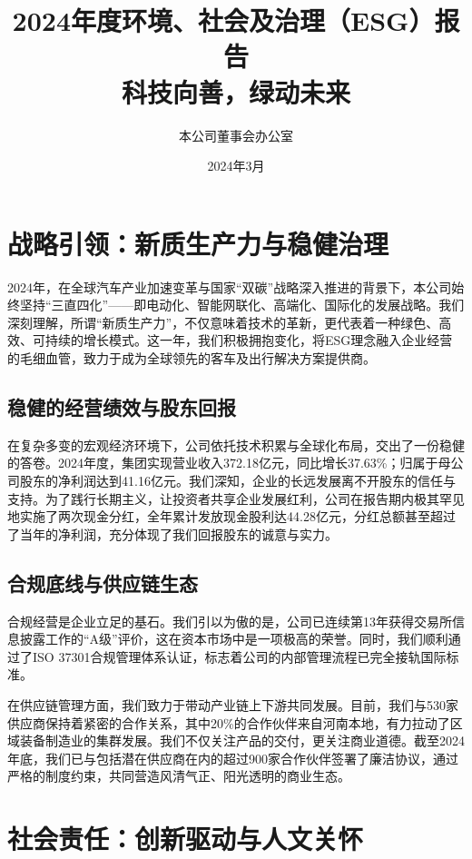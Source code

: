 \documentclass[a4paper,12pt]{article}
\title{\textbf{\huge 2024年度环境、社会及治理（ESG）报告}\\ \vspace{0.5em} \large 科技向善，绿动未来}
\author{本公司董事会办公室}
\date{2024年3月}
\begin{document}
\maketitle

\section{战略引领：新质生产力与稳健治理}

2024年，在全球汽车产业加速变革与国家“双碳”战略深入推进的背景下，本公司始终坚持“三直四化”——即电动化、智能网联化、高端化、国际化的发展战略。我们深刻理解，所谓“新质生产力”，不仅意味着技术的革新，更代表着一种绿色、高效、可持续的增长模式。这一年，我们积极拥抱变化，将ESG理念融入企业经营的毛细血管，致力于成为全球领先的客车及出行解决方案提供商。

\subsection{稳健的经营绩效与股东回报}

在复杂多变的宏观经济环境下，公司依托技术积累与全球化布局，交出了一份稳健的答卷。2024年度，集团实现营业收入372.18亿元，同比增长37.63\%；归属于母公司股东的净利润达到41.16亿元。我们深知，企业的长远发展离不开股东的信任与支持。为了践行长期主义，让投资者共享企业发展红利，公司在报告期内极其罕见地实施了两次现金分红，全年累计发放现金股利达44.28亿元，分红总额甚至超过了当年的净利润，充分体现了我们回报股东的诚意与实力。

\subsection{合规底线与供应链生态}

合规经营是企业立足的基石。我们引以为傲的是，公司已连续第13年获得交易所信息披露工作的“A级”评价，这在资本市场中是一项极高的荣誉。同时，我们顺利通过了ISO 37301合规管理体系认证，标志着公司的内部管理流程已完全接轨国际标准。

在供应链管理方面，我们致力于带动产业链上下游共同发展。目前，我们与530家供应商保持着紧密的合作关系，其中20\%的合作伙伴来自河南本地，有力拉动了区域装备制造业的集群发展。我们不仅关注产品的交付，更关注商业道德。截至2024年底，我们已与包括潜在供应商在内的超过900家合作伙伴签署了廉洁协议，通过严格的制度约束，共同营造风清气正、阳光透明的商业生态。

\section{社会责任：创新驱动与人文关怀}
\end{document}
